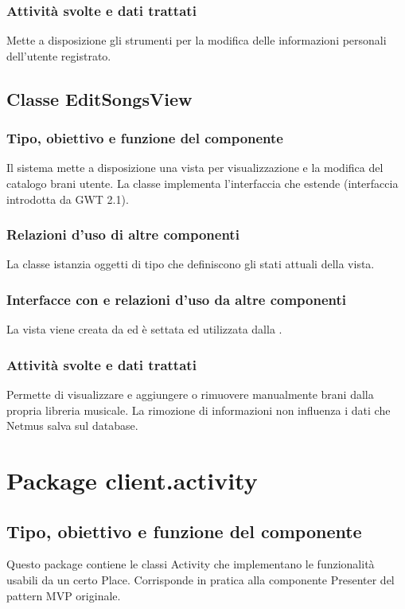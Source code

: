 \subsubsection*{Attivit\`a svolte e dati trattati}
Mette a disposizione gli strumenti per la modifica delle informazioni personali
dell'utente registrato.

\subsection{Classe EditSongsView}
\subsubsection*{Tipo, obiettivo e funzione del componente}
Il sistema mette a disposizione una vista per visualizzazione e la modifica del
catalogo brani utente. La classe  implementa l'interfaccia
 che estende  (interfaccia introdotta da GWT
2.1).
\subsubsection*{Relazioni d'uso di altre componenti}
La classe istanzia oggetti di tipo  che definiscono gli stati
attuali della vista.
\subsubsection*{Interfacce con e relazioni d'uso da altre componenti}
La vista viene creata da  ed \`e settata ed utilizzata dalla
.
\subsubsection*{Attivit\`a svolte e dati trattati}
Permette di visualizzare e aggiungere o rimuovere manualmente brani dalla
propria libreria musicale. La rimozione di informazioni non influenza i dati che
Netmus salva sul database.

\newpage
\section{Package client.activity} %
\subsection*{Tipo, obiettivo e funzione del componente}
Questo package contiene le classi Activity che implementano le funzionalit\`a
usabili da un certo Place. Corrisponde in pratica alla componente Presenter del
pattern MVP originale.
